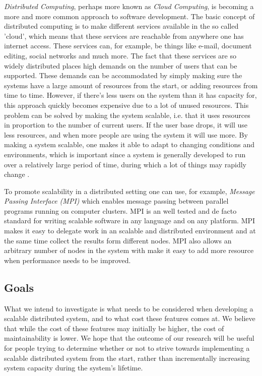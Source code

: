 \documentclass{article}
\begin{document}
\emph{Distributed Computing}, perhaps more known as \emph{Cloud Computing}, is becoming a
more and more common approach to software development. The basic concept of
distributed computing is to make different services available in the so called
'cloud', which means that these services are reachable from anywhere one has
internet access. These services can, for example, be things like e-mail,
document editing, social networks and much more. The fact that these services
are so widely distributed places high demands on the number of users that can
be supported. These demands can be accommodated by simply making sure the
systems have a large amount of resources from the start, or adding resources
from time to time. However, if there's less users on the system than it has
capacity for, this approach quickly becomes expensive due to a lot of unused
resources. This problem can be solved by making the system scalable, i.e. that
it uses resources in proportion to the number of current users. If the user
base drops, it will use less resources, and when more people are using the
system it will use more. By making a system scalable, one makes it able to
adapt to changing conditions and environments, which is important since a
system is generally developed to run over a relatively large period of time,
during which a lot of things may rapidly change \cite{van1998software}
\cite{caruso1997toward}.

To promote scalability in a distributed setting one can use, for example,
\emph{Message Passing Interface (MPI)} which enables message passing between
parallel programs running on computer clusters. MPI is
an well tested and de facto standard for writing scalable software in any
language and on any platform. MPI makes it easy to delegate work in an
scalable and distributed environment and at the same time collect the results
form different nodes. MPI also allows an arbitrary number of nodes in the 
system with make it easy to add more resource when performance needs to
be improved. \cite{gropp1996high}
 
\subsection{Goals} 

What we intend to investigate is what needs to be considered
when developing a scalable distributed system, and to what cost these features
comes at. We believe that while the cost of these features may initially be
higher, the cost of maintainability is lower. We hope that the outcome of our
research will be useful for people trying to determine whether or not to strive
towards implementing a scalable distributed system from the start, rather than
incrementally increasing system capacity during the system's lifetime.
\end{document}
